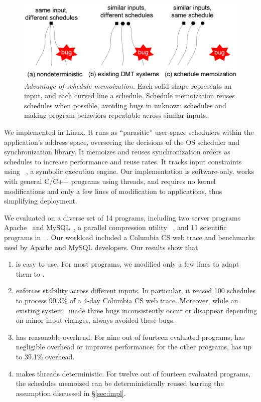 \begin{figure}[t]
\centering
\includegraphics[width=.5\textwidth]{tern/figures/idea.eps}
\caption{\small{\em Advantage of schedule memoization.}  Each solid shape
  represents an input, and each curved line a schedule.  Schedule
  memoization reuses schedules when possible, avoiding bugs in unknown
  schedules and making program behaviors repeatable across similar
  inputs.}
\label{fig:idea}
\end{figure}%


We implemented \tern in Linux.  It runs as ``parasitic''
user-space schedulers within the application's address space, overseeing
the decisions of the OS scheduler and synchronization library.  It
memoizes and reuses synchronization orders as schedules to increase
performance and reuse rates. It tracks input constraints using
\klee~\cite{klee:osdi08}, a symbolic execution engine.  Our implementation
is software-only, works with general C/C++ programs using threads, and
requires no kernel modifications and only a few lines of modification to
applications, thus simplifying deployment.

We evaluated \tern on a diverse set of 14 programs, including two server
programs Apache~\cite{apache} and MySQL~\cite{mysql}, a parallel
compression utility \pbzip~\cite{pbzip2}, and 11 scientific programs in
\splash~\cite{splash2}.  Our workload included a Columbia CS web trace and
benchmarks used by Apache and MySQL developers.  Our results show that

\begin{enumerate}

\item \tern is easy to use.  For most programs, we modified only a few
  lines to adapt them to \tern.

\item \tern enforces stability across different inputs.  In particular, it
  reused 100 schedules to process 90.3\% of a 4-day Columbia CS web trace.
  Moreover, while an existing \dmt system~\cite{coredet:asplos10} made
  three bugs inconsistently occur or disappear depending on minor input
  changes, \tern always avoided these bugs.

\item \tern has reasonable overhead.  For nine out of fourteen
  evaluated programs, \tern has negligible overhead or improves
  performance; for the other programs, \tern has up to 39.1\%
  overhead.

\item \tern makes threads deterministic.  For twelve out of fourteen
  evaluated programs, the schedules \tern memoized can be deterministically
  reused barring the assumption discussed in \S\ref{sec:impl}.

\end{enumerate}


